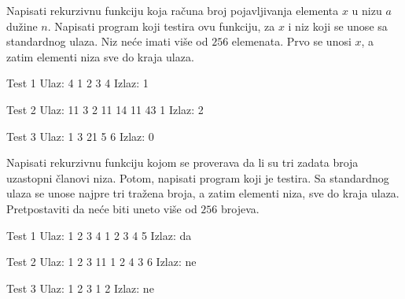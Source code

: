 \begin{Exercise}[label=112]
Napisati rekurzivnu funkciju  
  koja računa broj pojavljivanja
  elementa $x$ u nizu $a$ dužine $n$. Napisati program koji testira
  ovu funkciju, za $x$ i niz koji se unose sa standardnog
  ulaza. Niz neće imati više od $256$ elemenata. Prvo se unosi $x$, a zatim
  elementi niza sve do kraja ulaza.
  
\begin{miditest}
\begin{test}{Test 1}
Ulaz:    4 1 2 3 4     
Izlaz:   1              
\end{test}
\end{miditest}
\begin{miditest}
\begin{test}{Test 2}
Ulaz:    11 3 2 11 14 11 43 1      
Izlaz:   2                      
\end{test}
\end{miditest}

\begin{minitest}
\begin{test}{Test 3}
Ulaz:    1 3 21 5 6
Izlaz:   0    
\end{test}
\end{minitest}

\end{Exercise}
\begin{Answer}[ref=112]
\end{Answer}

\begin{Exercise}[label=114]
Napisati rekurzivnu funkciju 
  kojom se proverava da li su tri
  zadata broja uzastopni članovi niza. Potom, napisati program koji
  je testira. Sa standardnog ulaza se unose najpre tri tražena
  broja, a zatim elementi niza, sve do kraja ulaza. Pretpostaviti da
neće biti uneto više od $256$ brojeva.
  
\begin{miditest}
\begin{test}{Test 1}
Ulaz:     1 2 3 4 1 2 3 4 5 
Izlaz:    da                     
\end{test}
\end{miditest}
\begin{miditest}
\begin{test}{Test 2}
Ulaz:     1 2 3 11 1 2 4 3 6 
Izlaz:    ne                    
\end{test}
\end{miditest}

\begin{miditest}
\begin{test}{Test 3}
Ulaz:     1 2 3 1 2
Izlaz:    ne 
\end{test}
\end{miditest}

\end{Exercise}
\begin{Answer}[ref=114]
\end{Answer}

